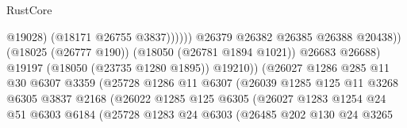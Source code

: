 \begin{lexlean}{RustCore}
\begin{coremodule}
                                                        @19028)
                                                      (@18171 @26755 @3837))))))
                                            @26379
                                            @26382
                                            @26385
                                            @26388
                                            @20438))
                                        (@18025 (@26777 @190))
                                        (@18050 (@26781 @1894 @1021))
                                        @26683
                                        @26688)
                                      @19197
                                      (@18050 (@23735 @1280 @1895))
                                      @19210))
                                  (@26027
                                    @1286
                                    @285
                                    @11
                                    @30
                                    @6307
                                    @3359
                                    (@25728
                                      @1286
                                      @11
                                      @6307
                                      (@26039
                                        @1285
                                        @125
                                        @11
                                        @3268
                                        @6305
                                        @3837
                                        @2168
                                        (@26022
                                          @1285
                                          @125
                                          @6305
                                          (@26027
                                            @1283
                                            @1254
                                            @24
                                            @51
                                            @6303
                                            @6184
                                            (@25728
                                              @1283
                                              @24
                                              @6303
                                              (@26485
                                                @202
                                                @130
                                                @24
                                                @3265

\end{coremodule}
\end{lexlean}
